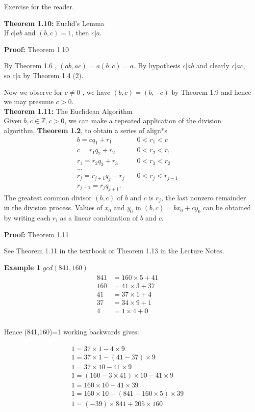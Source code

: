 \documentclass[a4paper]{article}
\begin{document}
Exercise for the reader.

\textbf{Theorem 1.10:} Euclid's Lemma\\
If $c|ab$ and $(b,c)=1$, then $c|a$.

\textbf{Proof:} Theorem 1.10

By Theorem 1.6 , $(ab,ac)=a(b,c)=a$. By hypothesis $c|ab$ and clearly $c|ac$,
so $c|a$ by Theorem 1.4 (2).

Now we observe for $c\neq 0$ , we have $(b,c)=(b,-c)$ by Theorem 1.9 and
hence we may presume $c>0$. \\

\textbf{Theorem 1.11:} The Euclidean Algorithm\\
Given $b,c\in\mathbb{Z}, c>0$, we can make a repeated
application of the division algorithm, \textbf{Theorem 1.2},
to obtain a series of align*s
\begin{align}
b=cq_1+r_1          & \quad0<r_1<c\\
c=r_1q_2+r_2        & \quad0<r_2<r_1\\
r_1=r_2q_3+r_3      & \quad0<r_3<r_2\\
...\\
r_j=r_{j+1}q_j+r_j  & \quad0<r_j<r_{j-1}\\
r_{j-1}=r_jq_{j+1}.
\end{align}
The greatest common divisor $(b,c)$ of $b$ and $c$ is $r_j$,
the last nonzero remainder in the division process.
Values of $x_0$ and $y_0$ in $(b,c)=bx_0+cy_0$
can be obtained by writing each $r_i$ as a linear combination
of $b$ and $c$.

\textbf{Proof:} Theorem 1.11

See Theorem 1.11 in the textbook or Theorem 1.13 in the Lecture Notes.

\textbf{Example 1}
$gcd(841,160)$
\begin{align*}
\begin{split}
841&=160\times5 + 41 \\
160&=41\times3 + 37 \\
41&=37\times 1 + 4 \\
37&=34\times 9 + 1 \\
4&=1\times 4 + 0 \\
\end{split}
\end{align*}

Hence (841,160)=1 working backwards gives:


\begin{align*}
\begin{split}
1=37\times1 - 4\times9 \\
1=37\times1 - (41-37)\times9 \\
1=37\times10 - 41\times9 \\
1=(160-3\times41)\times10 - 41 \times 9 \\
1=160\times10 - 41\times39 \\
1=160\times10 - (841-160\times5)\times39 \\
1=(-39)\times841 + 205\times160 \\
\end{split}
\end{align*}
\end{document}
